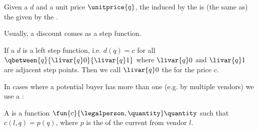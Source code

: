\begin{module}[id=price-function]
\begin{assertion}[type=observation]
  Given a  $d$ and a unit price $\unitprice{q}$, the
   induced by the
   is (the same as) the
   given by the .
\end{assertion}

 Usually, a discount comes as a step function.

\begin{definition}[functions=d]
  If a  $d$ is a left step function, i.e.  $d(q)=c$ for all
  $\qbetween{q}{\livar{q}0}{\livar{q}1}$ where $\livar{q}0$ and $\livar{q}1$ are adjacent
  step points. Then we call $\livar{q}0$ the  for the price $c$.
\end{definition}

In cases where a potential buyer has more than one  (e.g. by multiple vendors) we use
a :

\begin{definition}[functions={c,p}]
  A  is a function
  $\fun{c}{\legalperson,\quantity}\quantity$ such that $c(l,q)=p(q)$, where $p$ is the
   of the current  from vendor $l$.
\end{definition}


\end{module}


